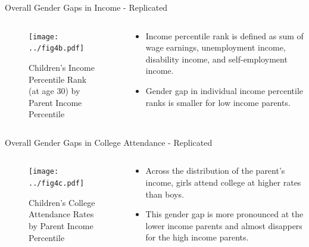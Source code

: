 \documentclass{beamer}
\begin{document}
\begin{frame}{Overall Gender Gaps in Income - Replicated}
\begin{columns}
	
	\begin{column}{0.52\textwidth}
		\vspace{\topsep}
		\begin{figure}
			\vspace{-0.5cm}	
			\texttt{[image: ../fig4b.pdf]}
			\caption{{\scriptsize Children’s Income Percentile Rank (at age 30) by Parent Income Percentile}}
		\end{figure}	
	\end{column}
	
	\begin{column}{0.4\textwidth}
		\vspace{-2.5cm}
		\begin{itemize}
			\item Income percentile rank is defined as sum of wage earnings, unemployment income, disability income, and self-employment income.
			\item Gender gap in individual income percentile ranks is smaller for low income parents.
		\end{itemize}
	
	\end{column}
	
\end{columns}
\end{frame}

\begin{frame}{Overall Gender Gaps in College Attendance - Replicated}
\begin{columns}
	
	\begin{column}{0.52\textwidth}
		\vspace{\topsep}
		\begin{figure}
			\vspace{-0.5cm}	
			\texttt{[image: ../fig4c.pdf]}
			\caption{{\scriptsize Children’s College Attendance Rates by Parent Income Percentile}}
		\end{figure}	
	\end{column}
	
	\begin{column}{0.4\textwidth}
		\vspace{-2.5cm}	
		\begin{itemize}
			\item Across the distribution of the parent's income, girls attend college at higher rates than boys. 
			\item This gender gap is more pronounced at the lower income parents and almost disappers for the high income parents.
		\end{itemize}
	\end{column}
	
\end{columns}
\end{frame}
\end{document}
